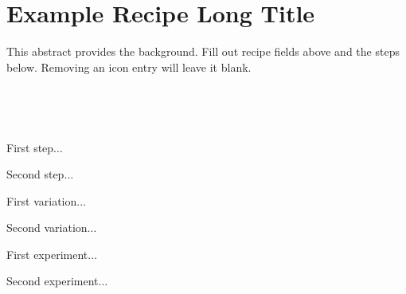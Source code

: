 \section[Example Recipe]{Example Recipe Long Title~\vegan}




\begin{recipestats}[
	servings=servings,
	preptime=preparation time,
	bakingtime=cook time,
	inactivetime=inactive time,
	source=source / author,
	original=original source,
]
\end{recipestats}


\begin{recipeabstract}
	This abstract provides the background.
	Fill out recipe fields above and the steps below.
	Removing an icon entry will leave it blank.
\end{recipeabstract}




\begin{ingredientcolumns}
	\begin{ingredientblock}
		\\
	\end{ingredientblock}

	\begin{ingredientblock}
		\\
	\end{ingredientblock}
\end{ingredientcolumns}


\begin{preparation}
\item First step$\ldots$
\item Second step$\ldots$
\end{preparation}


\begin{variation}
\item First variation$\ldots$
\item Second variation$\ldots$
\end{variation}


\begin{experiments}
\item First experiment$\ldots$
\item Second experiment$\ldots$

\end{experiments}


\recipeend%
